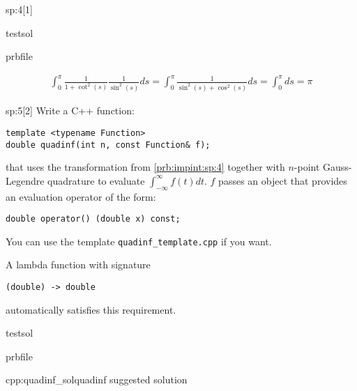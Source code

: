 \begin{samproblem}
\begin{subproblem}{sp:4}[1]
  \begin{samwriteprbpart}{testsol}
    \begin{writeverbatim}{prbfile}
      \begin{samsolution}
        \begin{align}
          \int_0^\pi \frac{1}{1 + \cot^2(s)} \frac{1}{\sin^2(s)} ds = \int_0^\pi \frac{1}{\sin^2(s) + \cos^2(s)} ds = \int_0^\pi ds = \pi
        \end{align}
      \end{samsolution}
    \end{writeverbatim}
  \end{samwriteprbpart}

\end{subproblem}

\begin{subproblem}{sp:5}[2] 
  Write a C++ function:
  \begin{lstlisting}[style=cpp]
template <typename Function>
double quadinf(int n, const Function& f);
  \end{lstlisting}
  that uses the transformation from \ref{prb:impint:sp:4} together with $n$-point Gauss-Legendre quadrature to evaluate $\int_{-\infty}^{\infty} f(t) dt$. 
  $f$ passes an object that provides an evaluation operator of the form:
  \begin{lstlisting}
double operator() (double x) const;
  \end{lstlisting}

  \begin{samhint}
    You can use the template \verb|quadinf_template.cpp| if you want.
  \end{samhint}

  \begin{samhint}
    A lambda function with signature
    \begin{lstlisting}[style=cpp]
(double) -> double
    \end{lstlisting}
    automatically satisfies this requirement.
  \end{samhint}

  \begin{samwriteprbpart}{testsol}
    \begin{writeverbatim}{prbfile}
      \begin{samsolution}
        \begin{samcode}[C++-code]{cpp:quadinf_sol}{quadinf suggested solution}
          \small
          
        \end{samcode}
      \end{samsolution}
    \end{writeverbatim}
  \end{samwriteprbpart}


\end{subproblem}
\end{samproblem}
